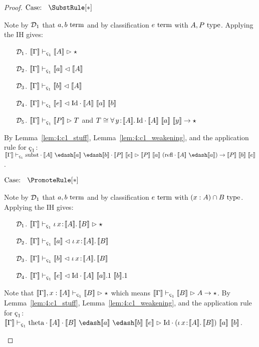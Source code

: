 \begin{proof}
    $\text{Case: }\begin{array}{c} \SubstRule[*] \end{array}$
    \begin{proofcase}
        Note by $\mathcal{D}_{1}$ that $a, b~\textnormal{term}$ and by classification $e~\textnormal{term}$ with $A, P~\textnormal{type}$.
        Applying the IH gives:
        \begin{enumerate}
            \item[$\mathcal{D}_{1}$.] $\sema{\Gamma} \vdash_{\oldced} \sema{A} \infr \star$
            \item[$\mathcal{D}_{2}$.] $\sema{\Gamma} \vdash_{\oldced} \sema{a} \chck \sema{A}$
            \item[$\mathcal{D}_{3}$.] $\sema{\Gamma} \vdash_{\oldced} \sema{b} \chck \sema{A}$
            \item[$\mathcal{D}_{4}$.] $\sema{\Gamma} \vdash_{\oldced} \sema{e} \chck \cId \cdot \sema{A}\ \sema{a}\ \sema{b}$
            \item[$\mathcal{D}_{5}$.] $\sema{\Gamma} \vdash_{\oldced} \sema{P} \infr T$ and $T \cong {\forall}\, y\! : \! \llbracket A \rrbracket.\, \textnormal{Id} \cdot \llbracket A \rrbracket\ \llbracket a \rrbracket\ \llbracket y \rrbracket \to \star$
        \end{enumerate}
        By Lemma~\ref{lem:4:c1_stuff}, Lemma~\ref{lem:4:c1_weakening}, and the application rule for $\oldced$:
            $\sema{\Gamma} \vdash_{\oldced} \csubst \cdot \sema{A}\ \edash \sema{a}\ \edash \sema{b} \cdot \sema{P}\ \sema{e} \infr \sema{P}\ \sema{a}\ (\crefl \cdot \sema{A}\ \edash \sema{a}) \to \sema{P}\ \sema{b}\ \sema{e}$.
    \end{proofcase}

    $\text{Case: }\begin{array}{c} \PromoteRule[*] \end{array}$
    \begin{proofcase}
        Note by $\mathcal{D}_{1}$ that $a, b~\textnormal{term}$ and by classification $e~\textnormal{term}$ with $(x : A) \cap B~\textnormal{type}$.
        Applying the IH gives:
        \begin{enumerate}
            \item[$\mathcal{D}_{1}$.] $\sema{\Gamma} \vdash_{\oldced} \abs{\iota}{x}{\sema{A}}{\sema{B}} \infr \star$
            \item[$\mathcal{D}_{2}$.] $\sema{\Gamma} \vdash_{\oldced} \sema{a} \chck \abs{\iota}{x}{\sema{A}}{\sema{B}}$
            \item[$\mathcal{D}_{3}$.] $\sema{\Gamma} \vdash_{\oldced} \sema{b} \chck \abs{\iota}{x}{\sema{A}}{\sema{B}}$
            \item[$\mathcal{D}_{4}$.] $\sema{\Gamma} \vdash_{\oldced} \sema{e} \chck \cId \cdot \sema{A}\ \sema{a}.1\ \sema{b}.1$
        \end{enumerate}
        Note that $\sema{\Gamma}, x : \sema{A} \vdash_{\oldced} \sema{B} \infr \star$ which means $\sema{\Gamma} \vdash_{\oldced} \sema{B} \infr A \to \star$.
        By Lemma~\ref{lem:4:c1_stuff}, Lemma~\ref{lem:4:c1_weakening}, and the application rule for $\oldced$:
            $\sema{\Gamma} \vdash_{\oldced} \ctheta \cdot \sema{A} \cdot \sema{B}\ \edash \sema{a}\ \edash \sema{b}\ \sema{e} \infr \cId \cdot (\abs{\iota}{x}{\sema{A}}{\sema{B}})\ \sema{a}\ \sema{b}$.
    \end{proofcase}


\end{proof}

